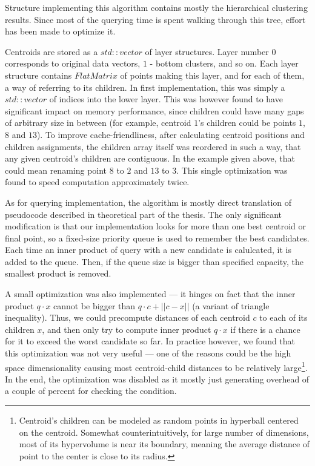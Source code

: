 Structure implementing this algorithm contains mostly the hierarchical clustering results.
Since most of the querying time is spent walking through this tree, effort has been made
to optimize it.

Centroids are stored as a $std::vector$ of layer structures. Layer number $0$ corresponds
to original data vectors, $1$ - bottom clusters, and so on. Each layer structure contains
$FlatMatrix$ of points making this layer, and for each of them, a way of referring to
its children. In first implementation, this was simply a $std::vector$ of indices into
the lower layer. This was however found to have significant impact on memory performance,
since children could have many gaps of arbitrary size in between (for example, centroid
$1$'s children could be points $1$, $8$ and $13$). To improve cache-friendliness, after
calculating centroid positions and children assignments, the children array itself was 
reordered in such a way, that any given centroid's children are contiguous. In the example
given above, that could mean renaming point $8$ to $2$ and $13$ to $3$. This single
optimization was found to speed computation approximately twice.

As for querying implementation, the algorithm is mostly direct translation of pseudocode
described in theoretical part of the thesis. The only significant modification is 
that our implementation looks for more than one best centroid or final point, so a
fixed-size priority queue is used to remember the best candidates. Each time an inner
product of query with a new candidate is calulcated, it is added to the queue.
Then, if the queue size is bigger than specified capacity, the smallest product is
removed.

A small optimization was also implemented --- it hinges on fact that the inner product
$q \cdot x$ cannot be bigger than $q \cdot c + ||c - x||$ (a variant of triangle inequality).
Thus, we could precompute distances of each centroid $c$ to each of its children $x$,
and then only try to compute inner product $q \cdot x$ if there is a chance for 
it to exceed the worst candidate so far. In practice however, we found that this
optimization was not very useful --- one of the reasons could be the high space
dimensionality causing most centroid-child distances to be relatively large\footnote{
Centroid's children can be modeled as random points in hyperball centered on the
centroid. Somewhat counterintuitively, for large number of dimensions, 
most of its hypervolume is near its boundary, meaning the average distance of point
to the center is close to its radius.
}. In the end, the optimization was disabled as it mostly just generating overhead of a
couple of percent for checking the condition.
